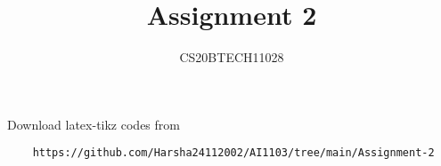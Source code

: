 \documentclass[journal,12pt,twocolumn]{IEEEtran}
\DeclareMathOperator*{\Res}{Res}
\begin{document}
\newcommand{\BEQA}{\begin{eqnarray}}
\newcommand{\EEQA}{\end{eqnarray}}
\newcommand{\define}{\stackrel{\triangle}{=}}

\raggedbottom
\setlength{\parindent}{0pt}
\providecommand{\mbf}{\mathbf}
\providecommand{\pr}[1]{\ensuremath{\Pr\left(#1\right)}}
\providecommand{\qfunc}[1]{\ensuremath{Q\left(#1\right)}}
\providecommand{\sbrak}[1]{\ensuremath{{}\left[#1\right]}}
\providecommand{\lsbrak}[1]{\ensuremath{{}\left[#1\right.}}
\providecommand{\rsbrak}[1]{\ensuremath{{}\left.#1\right]}}
\providecommand{\brak}[1]{\ensuremath{\left(#1\right)}}
\providecommand{\lbrak}[1]{\ensuremath{\left(#1\right.}}
\providecommand{\rbrak}[1]{\ensuremath{\left.#1\right)}}
\providecommand{\cbrak}[1]{\ensuremath{\left\{#1\right\}}}
\providecommand{\lcbrak}[1]{\ensuremath{\left\{#1\right.}}
\providecommand{\rcbrak}[1]{\ensuremath{\left.#1\right\}}}
\theoremstyle{remark}
\newtheorem{rem}{Remark}
\newcommand{\sgn}{\mathop{\mathrm{sgn}}}
\providecommand{\abs}[1]{\vert#1\vert}
\providecommand{\res}[1]{\Res\displaylimits_{#1}} 
\providecommand{\norm}[1]{\lVert#1\rVert}
\providecommand{\mtx}[1]{\mathbf{#1}}
\providecommand{\mean}[1]{E[ #1 ]}
\providecommand{\fourier}{\overset{\mathcal{F}}{ \rightleftharpoons}}
\providecommand{\system}{\overset{\mathcal{H}}{ \longleftrightarrow}}
\newcommand{\solution}{\noindent \textbf{Solution: }}
\newcommand{\cosec}{\,\text{cosec}\,}
\providecommand{\dec}[2]{\ensuremath{\overset{#1}{\underset{#2}{\gtrless}}}}
\newcommand{\myvec}[1]{\ensuremath{\begin{pmatrix}#1\end{pmatrix}}}
\newcommand{\mydet}[1]{\ensuremath{\begin{vmatrix}#1\end{vmatrix}}}
\makeatletter
{}
\makeatother
\let\StandardTheFigure\thefigure
\let\vec\mathbf
\renewcommand{\thefigure}{\theproblem}
\def\putbox#1#2#3{\makebox[0in][l]{\makebox[#1][l]{}\raisebox{\baselineskip}[0in][0in]{\raisebox{#2}[0in][0in]{#3}}}}
     \def\rightbox#1{\makebox[0in][r]{#1}}
     \def\centbox#1{\makebox[0in]{#1}}
     \def\topbox#1{\raisebox{-\baselineskip}[0in][0in]{#1}}
     \def\midbox#1{\raisebox{-0.5\baselineskip}[0in][0in]{#1}}
\vspace{3cm}
\title{Assignment 2}
\author{CS20BTECH11028}
\maketitle
\newpage
\bigskip
\renewcommand{\thefigure}{\theenumi}
\renewcommand{\thetable}{\theenumi}
%
Download latex-tikz codes from 
%
\begin{lstlisting}
    https://github.com/Harsha24112002/AI1103/tree/main/Assignment-2
\end{lstlisting}
\end{document}
